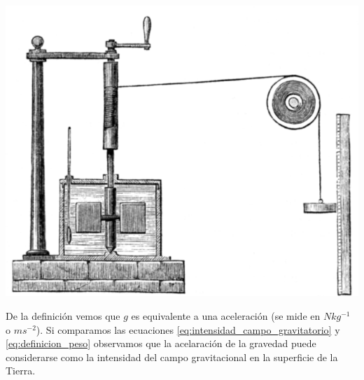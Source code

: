 \begin{marginfigure}
  \includegraphics[width=\linewidth]{JouleApparatus.pdf}
  \caption{Aparato de Joule para la medida del equivalente mec\'anico del calor. Joule demostr\'o que el calor necesario para elevar la temperatura de 1 kg de agua de $15\celsius$ a $16\celsius$ equivale a la energ\'\i{}a potencial de 427 kg que se encuentren a la altura de 1 metro sobre el suelo.}
  \label{fig:JouleApparatus}
\end{marginfigure}

De la definici\'on vemos que $g$ es equivalente a una aceleraci\'on (se mide en $Nkg^{-1}$ o $ms^{-2}$). Si comparamos las ecuaciones \ref{eq:intensidad_campo_gravitatorio} y \ref{eq:definicion_peso} observamos que la acelaraci\'on de la gravedad puede considerarse como la intensidad del campo gravitacional en la superficie de la Tierra.

